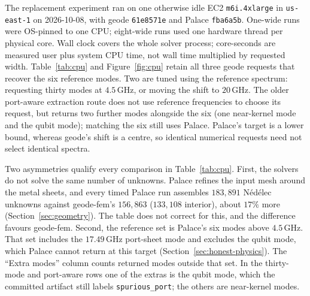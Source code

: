 \documentclass{anvil-paper}
\begin{document}
The replacement experiment ran on one otherwise idle EC2
\texttt{m6i.4xlarge} in \texttt{us-east-1} on 2026-10-08, with geode
\texttt{61e8571e} and Palace \texttt{fba6a5b}. One-wide runs were
OS-pinned to one CPU; eight-wide runs used one hardware thread per
physical core. Wall clock covers the whole solver process; core-seconds
are measured user plus system CPU time, not wall time multiplied by
requested width. Table~\ref{tab:cpu} and Figure~\ref{fig:cpu} retain all three geode requests
that recover the six reference modes. Two are tuned using the reference
spectrum: requesting thirty modes at $4.5$\,GHz, or moving the shift to
$20$\,GHz. The older port-aware extraction route does not use reference
frequencies to choose its request, but returns two further modes
alongside the six (one near-kernel mode and the qubit mode); matching
the six still uses Palace.
Palace's target is a lower bound, whereas geode's shift is a centre, so
identical numerical requests need not select identical spectra.

Two asymmetries qualify every comparison in Table~\ref{tab:cpu}. First,
the solvers do not solve the same number of unknowns. Palace refines
the input mesh around the metal sheets, and every timed Palace run
assembles $183{,}891$ N\'ed\'elec unknowns against geode-fem's
$156{,}863$ ($133{,}108$ interior), about $17\%$ more
(Section~\ref{sec:geometry}). The table does not correct for this, and
the difference favours geode-fem. Second, the reference set is Palace's
six modes above $4.5$\,GHz. That set includes the $17.49$\,GHz
port-sheet mode and excludes the qubit mode, which Palace cannot return
at this target (Section~\ref{sec:honest-physics}). The ``Extra modes''
column counts returned modes outside that set. In the thirty-mode and
port-aware rows one of the extras is the qubit mode, which the committed
artifact still labels \texttt{spurious\_port}; the others are
near-kernel modes.
\end{document}
